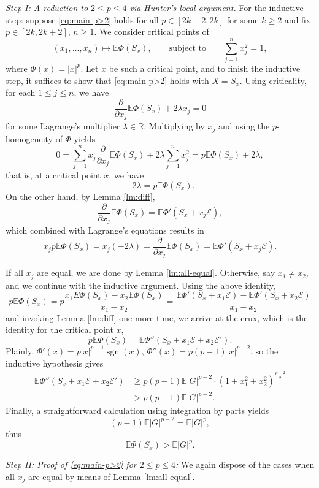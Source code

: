 \documentclass[10pt]{article}
\newcommand{\E}{\mathbb{E}}
\newcommand{\1}{\textbf{1}}
\newcommand{\R}{\mathbb{R}}
\newcommand{\cE}{\mathscr{E}}
\DeclareMathOperator{\sgn}{sgn}
\theoremstyle{remark}
\theoremstyle{definition}
\begin{document}
\emph{Step I: A reduction to $2 \leq p \leq 4$ via Hunter's local argument.} 
For the inductive step: suppose \eqref{eq:main-p>2} holds for all $p \in [2k-2, 2k]$ for some $k \geq 2$ and fix $p \in [2k, 2k+2]$, $n \geq 1$. We consider critical points of
\[ 
(x_1, \dots, x_n) \mapsto \E\Phi(S_x), \qquad \text{subject to} \qquad \sum_{j=1}^n x_j^2 = 1,
 \]
where $\Phi(x) = |x|^p$. Let $x$ be such a critical point, and to finish the inductive step, it suffices to show that  \eqref{eq:main-p>2} holds with $X = S_x$. Using criticality, for each $1 \leq j \leq n$, we have
\[ 
\frac{\partial}{\partial x_j}\E\Phi(S_x) +2\lambda x_j = 0
 \]
for some Lagrange's multiplier $\lambda \in \R$. Multiplying by $x_j$ and using the $p$-homogeneity of $\Phi$ yields
\[ 
0 = \sum_{j=1}^n x_j\frac{\partial}{\partial x_j}\E\Phi(S_x) + 2\lambda\sum_{j=1}^n x_j^2 = p\E\Phi(S_x) + 2\lambda,
 \]
that is, at a critical point $x$, we have
\[ 
-2\lambda = p\E\Phi(S_x).
 \]
On the other hand, by Lemma \ref{lm:diff},
\[ 
\frac{\partial}{\partial x_j}\E\Phi(S_x) = \E \Phi'(S_x+x_j\cE),
 \]
which combined with Lagrange's equations results in
\[ 
x_jp\E\Phi(S_x) = x_j(-2\lambda) = \frac{\partial}{\partial x_j}\E\Phi(S_x) = \E\Phi'(S_x + x_j\cE).
 \]

If all $x_j$ are equal, we are done by Lemma \ref{lm:all-equal}. Otherwise, say $x_1 \neq x_2$, and we continue with the inductive argument. Using the above identity,
\[
p\E\Phi(S_x) = p\frac{x_1E\Phi(S_x) - x_2\E\Phi(S_x)}{x_1-x_2} 
= \frac{\E\Phi'(S_x + x_1\cE) - \E\Phi'(S_x + x_2\cE)}{x_1-x_2} 
\]
and invoking  Lemma \ref{lm:diff} one more time, we arrive at the crux, which is the identity for the critical point $x$,
\begin{equation}\label{eq:crux}
p\E\Phi(S_x)  = \E\Phi''(S_x + x_1\cE + x_2\cE').
\end{equation}
Plainly, $\Phi'(x) = p|x|^{p-1}\sgn(x)$, $\Phi''(x) = p(p-1)|x|^{p-2}$, so the inductive hypothesis gives
\begin{align*}
\E\Phi''(S_x + x_1\cE + x_2\cE') &\geq p(p-1)\E|G|^{p-2}\cdot (1+x_1^2+x_2^2)^{\frac{p-2}{2}} \\
&> p(p-1)\E|G|^{p-2}.
 \end{align*}
Finally, a straightforward calculation using integration by parts yields
\[ 
(p-1)\E|G|^{p-2} = \E|G|^p,
 \]
thus
\[ 
\E\Phi(S_x) > \E|G|^p.
 \]


\emph{Step II: Proof of \eqref{eq:main-p>2} for $2 \leq p \leq 4$:}
We again dispose of the cases when all $x_j$ are equal by means of Lemma \ref{lm:all-equal}. 
\end{document}
